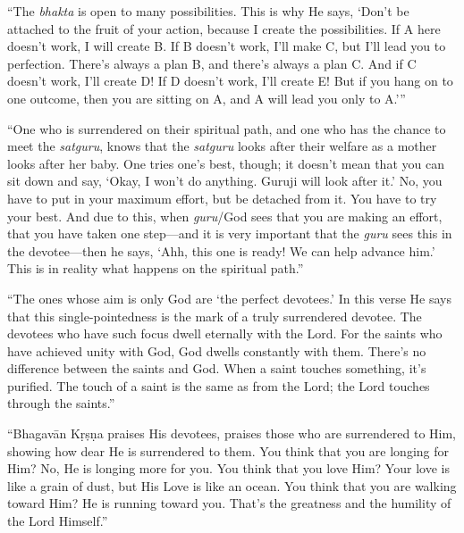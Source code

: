 \enquote{The \textit{bhakta} is open to many possibilities. This is why He says, \enquote{Don’t be attached to the fruit of your action, because I create the possibilities. If A here doesn’t work, I will create B. If B doesn’t work, I’ll make C, but I’ll lead you to perfection. There’s always a plan B, and there’s always a plan C. And if C doesn’t work, I’ll create D! If D doesn’t work, I’ll create E! But if you hang on to one outcome, then you are sitting on A, and A will lead you only to A.}}

\enquote{One who is surrendered on their spiritual path, and one who has the chance to meet the \textit{satguru}, knows that the \textit{satguru} looks after their welfare as a mother looks after her baby. One tries one’s best, though; it doesn’t mean that you can sit down and say, \enquote{Okay, I won’t do anything. Guruji will look after it.} No, you have to put in your maximum effort, but be detached from it. You have to try your best. And due to this, when \textit{guru}/God sees that you are making an effort, that you have taken one step---and it is very important that the \textit{guru} sees this in the devotee---then he says, \enquote{Ahh, this one is ready! We can help advance him.} This is in reality what happens on the spiritual path.}

\enquote{The ones whose aim is only God are \enquote{the perfect devotees.} In this verse He says that this single-pointedness is the mark of a truly surrendered devotee. The devotees who have such focus dwell eternally with the Lord. For the saints who have achieved unity with God, God dwells constantly with them. There’s no difference between the saints and God. When a saint touches something, it’s purified. The touch of a saint is the same as from the Lord; the Lord touches through the saints.}

\enquote{Bhagavān Kṛṣṇa praises His devotees, praises those who are surrendered to Him, showing how dear He is surrendered to them. You think that you are longing for Him? No, He is longing more for you. You think that you love Him? Your love is like a grain of dust, but His Love is like an ocean. You think that you are walking toward Him? He is running toward you. That’s the greatness and the humility of the Lord Himself.}